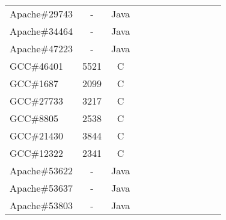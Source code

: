 \begin{table}[h!]
\begin{tabular}{lccccccccccc}
    Apache\#29743     &  -  & Java  &  &              &    &                                 &                   &                           &                    &&          \\
    Apache\#34464     &  -  & Java  &  &              &    &                                 &                   &                           &                    &&           \\
    Apache\#47223     &  -  & Java  &  &              &    &                                 &                   &                           &                    &&           \\
    \midrule
    GCC\#46401        &  5521  & C  &  &              &    &                                 &                   &                           &                    &&            \\
    GCC\#1687         &  2099  & C  &  &              &    &                                 &                   &                           &                    &&           \\
    GCC\#27733        &  3217  & C  &  &              &    &                                 &                   &                           &                    &&           \\
    GCC\#8805         &  2538  & C  &  &              &    &                                 &                   &                           &                    &&            \\
    GCC\#21430        &  3844  & C  &  &              &    &                                 &                   &                           &                    &&            \\
    GCC\#12322        &  2341  & C  &  &              &    &                                 &                   &                           &                    &&           \\
    \midrule
    \midrule
    Apache\#53622     &  -  & Java  &  &              &    &                                 &                   &                           &                    &&           \\
    Apache\#53637     &  -  & Java  &  &              &    &                                 &                   &                           &                    &&          \\
    Apache\#53803     &  -  & Java  &  &              &    &                                 &                   &                           &                    &&            \\

\end{tabular}
\end{table}
